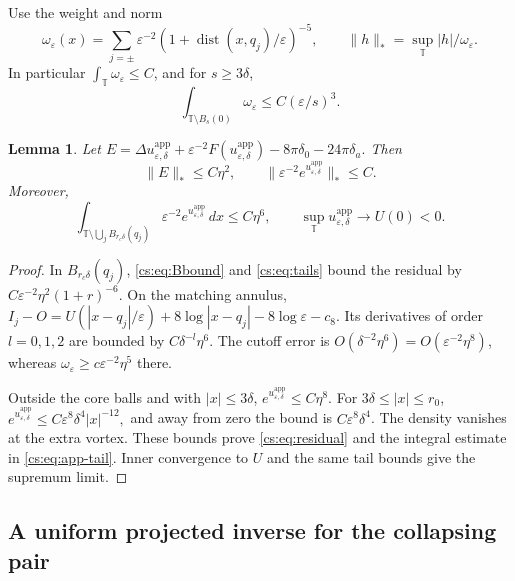 \documentclass[11pt,reqno]{amsart}
\numberwithin{equation}{section}
\newtheorem{lemma}[theorem]{Lemma}
\theoremstyle{definition}
\theoremstyle{remark}
\newcommand{\T}{\mathbb T}
\newcommand{\eps}{\varepsilon}
\newcommand{\dist}{\operatorname{dist}}
\newcommand{\dd}{\,dx}
\begin{document}
Use the weight and norm
\begin{equation}\label{cs:eq:weight}
 \omega_\eps(x)=\sum_{j=\pm}
       \eps^{-2}(1+\dist(x,q_j)/\eps)^{-5},
 \qquad \|h\|_*=\sup_\T |h|/\omega_\eps.
\end{equation}
In particular $\int_\T\omega_\eps\le C$, and for $s\ge3\delta$,
\begin{equation}\label{cs:eq:weight-tail}
 \int_{\T\setminus B_s(0)}\omega_\eps\le C(\eps/s)^3.
\end{equation}

\begin{lemma}\label{cs:lem:residual}
Let
\(
 E=\Delta u^{\mathrm{app}}_{\eps,\delta}+\eps^{-2}F(u^{\mathrm{app}}_{\eps,\delta})
                  -8\pi\delta_0-24\pi\delta_a.
\) Then
\begin{equation}\label{cs:eq:residual}
 \|E\|_*\le C\eta^2,\qquad
 \|\eps^{-2}e^{u^{\mathrm{app}}_{\eps,\delta}}\|_*\le C.
\end{equation}
Moreover,
\begin{equation}\label{cs:eq:app-tail}
 \int_{\T\setminus\bigcup_jB_{r_c\delta}(q_j)}
                \eps^{-2}e^{u^{\mathrm{app}}_{\eps,\delta}}\dd\le C\eta^6,
 \qquad \sup_\T u^{\mathrm{app}}_{\eps,\delta}\longrightarrow U(0)<0.
\end{equation}
\end{lemma}

\begin{proof}
In $B_{r_c\delta}(q_j)$, \eqref{cs:eq:Bbound} and \eqref{cs:eq:tails} bound
the residual by
$C\eps^{-2}\eta^2(1+r)^{-6}$.
On the matching annulus,
\(I_j-O=U(|x-q_j|/\eps)+8\log|x-q_j|-8\log\eps-c_8.\)
Its derivatives of order $l=0,1,2$ are bounded by
$C\delta^{-l}\eta^6$. The cutoff error is
$O(\delta^{-2}\eta^6)=O(\eps^{-2}\eta^8)$, whereas
$\omega_\eps\ge c\eps^{-2}\eta^5$ there.

Outside the core balls and with $|x|\le3\delta$,
$e^{u^{\mathrm{app}}_{\eps,\delta}}\le C\eta^8$. For $3\delta\le|x|\le r_0$,
\(e^{u^{\mathrm{app}}_{\eps,\delta}}\le C\eps^8\delta^4|x|^{-12},\)
and away from zero the bound is $C\eps^8\delta^4$.
The density vanishes at the extra vortex. These bounds prove
\eqref{cs:eq:residual} and the integral estimate in \eqref{cs:eq:app-tail}.
Inner convergence to $U$ and the same tail bounds give the supremum limit.
\end{proof}

\subsection{A uniform projected inverse for the collapsing pair}\label{cs:sec:inverse}
\end{document}
